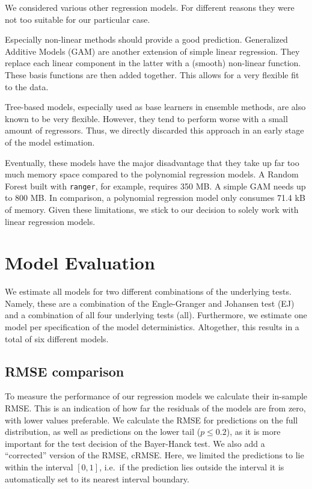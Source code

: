 \documentclass[12pt,a4paper]{article}
\begin{document}
We considered various other regression models. For different reasons
they were not too suitable for our particular case.

Especially non-linear methods should provide a good prediction.
Generalized Additive Models (GAM) are another extension of simple linear
regression. They replace each linear component in the latter with a
(smooth) non-linear function. These basis functions are then added
together. This allows for a very flexible fit to the data.
\autocite{James2013}

Tree-based models, especially used as base learners in ensemble methods,
are also known to be very flexible. However, they tend to perform worse
with a small amount of regressors. Thus, we directly discarded this
approach in an early stage of the model estimation.

Eventually, these models have the major disadvantage that they take up
far too much memory space compared to the polynomial regression models.
A Random Forest built with \texttt{ranger}, for example, requires 350
MB. A simple GAM needs up to 800 MB. In comparison, a polynomial
regression model only consumes 71.4 kB of memory. Given these
limitations, we stick to our decision to solely work with linear
regression models.

\hypertarget{model-evaluation}{%
\section{Model Evaluation}\label{model-evaluation}}

We estimate all models for two different combinations of the underlying
tests. Namely, these are a combination of the Engle-Granger and Johansen
test (EJ) and a combination of all four underlying tests (all).
Furthermore, we estimate one model per specification of the model
deterministics. Altogether, this results in a total of six different
models.

\hypertarget{rmse-comparison}{%
\subsection{RMSE comparison}\label{rmse-comparison}}

To measure the performance of our regression models we calculate their
in-sample RMSE. This is an indication of how far the residuals of the
models are from zero, with lower values preferable. We calculate the
RMSE for predictions on the full distribution, as well as predictions on
the lower tail (\(p \leq 0.2\)), as it is more important for the test
decision of the Bayer-Hanck test. We also add a ``corrected'' version of
the RMSE, cRMSE. Here, we limited the predictions to lie within the
interval \([0, 1]\), i.e.~if the prediction lies outside the interval it
is automatically set to its nearest interval boundary.
\end{document}
